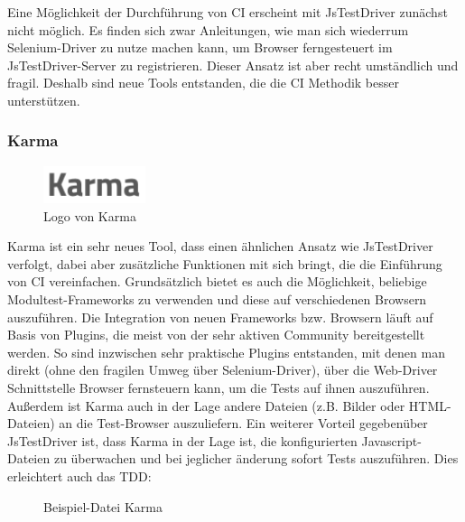 Eine Möglichkeit der Durchführung von \ac{CI} erscheint mit JsTestDriver zunächst nicht möglich. Es finden sich zwar Anleitungen, wie man sich wiederrum Selenium-Driver zu nutze machen kann, um Browser ferngesteuert im JsTestDriver-Server zu registrieren. Dieser Ansatz ist aber recht umständlich und fragil. Deshalb sind neue Tools entstanden, die die \ac{CI} Methodik besser unterstützen.

\subsubsection{Karma}

\begin{figure}[H]
	\begin{center}
		\includegraphics[width=3cm]{bilder/karma}
		\caption{Logo von Karma}
		\label{image:karma}
	\end{center}
\end{figure}

Karma ist ein sehr neues Tool, dass einen ähnlichen Ansatz wie JsTestDriver verfolgt, dabei aber zusätzliche Funktionen mit sich bringt, die die Einführung von \ac{CI} vereinfachen. Grundsätzlich bietet es auch die Möglichkeit, beliebige Modultest-Frameworks zu verwenden und diese auf verschiedenen Browsern auszuführen. Die Integration von neuen Frameworks bzw. Browsern läuft auf Basis von Plugins, die meist von der sehr aktiven Community bereitgestellt werden. So sind inzwischen sehr praktische Plugins entstanden, mit denen man direkt (ohne den fragilen Umweg über Selenium-Driver), über die Web-Driver Schnittstelle Browser fernsteuern kann, um die Tests auf ihnen auszuführen. Außerdem ist Karma auch in der Lage andere Dateien (z.B. Bilder oder HTML-Dateien) an die Test-Browser auszuliefern. Ein weiterer Vorteil gegebenüber JsTestDriver ist, dass Karma in der Lage ist, die konfigurierten Javascript-Dateien zu überwachen und bei jeglicher änderung sofort Tests auszuführen. Dies erleichtert auch das \ac{TDD}:

\begin{figure}[H]
	\begin{center}
		\caption{Beispiel-Datei Karma}
		\label{code:karma}
	\end{center}
\end{figure}


